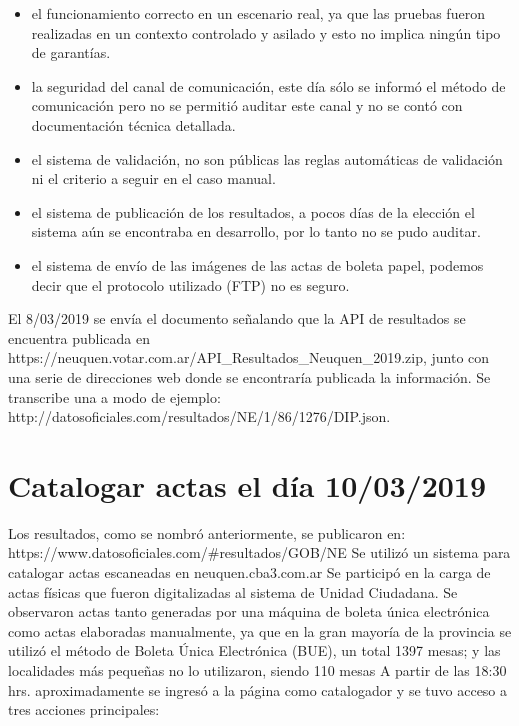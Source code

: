 \begin{itemize}
    \item el funcionamiento correcto en un escenario real, ya que las pruebas fueron realizadas en un contexto controlado y asilado y esto no implica ningún tipo de garantías.
    \item la seguridad del canal de comunicación, este día sólo se informó el método de comunicación pero no se permitió auditar este canal y no se contó con documentación técnica detallada.
    \item el sistema de validación, no son públicas las reglas automáticas de validación ni el criterio a seguir en el caso manual.
    \item el sistema de publicación de los resultados, a pocos días de la elección el sistema aún se encontraba en desarrollo, por lo tanto no se pudo auditar.
    \item el sistema de envío de las imágenes de las actas de boleta papel, podemos decir que el protocolo utilizado (FTP) no es seguro.
\end{itemize}
El 8/03/2019 se envía el documento señalando que la API de resultados se encuentra publicada en https://neuquen.votar.com.ar/API\_Resultados\_Neuquen\_2019.zip, junto con una serie de direcciones web donde se encontraría publicada la información. Se transcribe una a modo de ejemplo: http://datosoficiales.com/resultados/NE/1/86/1276/DIP.json. 

\section{Catalogar actas el día 10/03/2019}
Los resultados, como se nombró anteriormente, se publicaron en: \newline https://www.datosoficiales.com/#resultados/GOB/NE 
\newline Se utilizó un sistema para catalogar actas escaneadas en neuquen.cba3.com.ar \newline
Se participó en la carga de actas físicas que fueron digitalizadas al sistema de Unidad Ciudadana. Se observaron actas tanto generadas por una máquina de boleta única electrónica como actas elaboradas manualmente, ya que en la gran mayoría de la provincia se utilizó el método de Boleta Única Electrónica (BUE), un total 1397 mesas; y las localidades más pequeñas no lo utilizaron, siendo 110 mesas \cite{eleccionesNeuquenBUE} \newline
A partir de las 18:30 hrs. aproximadamente se ingresó a la página como catalogador y se tuvo acceso a tres acciones principales: 

